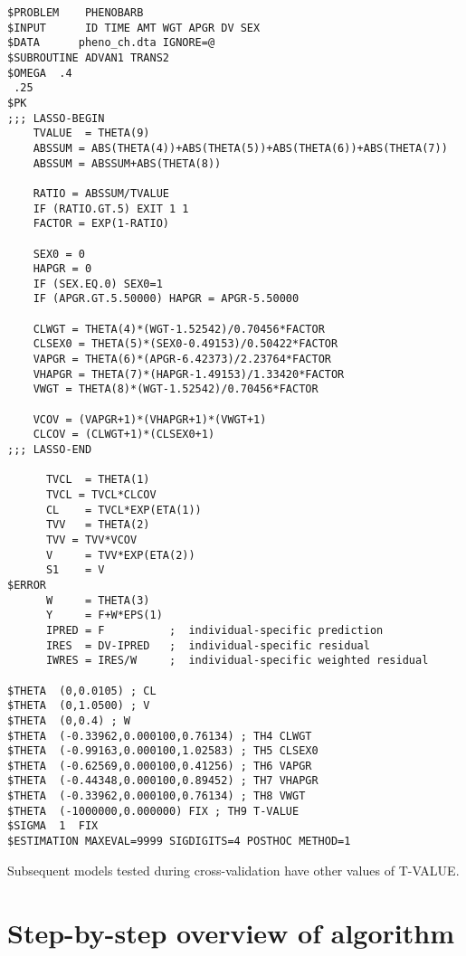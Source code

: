 \documentclass[a4paper,12pt]{article}
\begin{document}
\begin{verbatim}
$PROBLEM    PHENOBARB
$INPUT      ID TIME AMT WGT APGR DV SEX
$DATA      pheno_ch.dta IGNORE=@
$SUBROUTINE ADVAN1 TRANS2
$OMEGA  .4
 .25
$PK
;;; LASSO-BEGIN
    TVALUE  = THETA(9)
    ABSSUM = ABS(THETA(4))+ABS(THETA(5))+ABS(THETA(6))+ABS(THETA(7))
    ABSSUM = ABSSUM+ABS(THETA(8))

    RATIO = ABSSUM/TVALUE
    IF (RATIO.GT.5) EXIT 1 1
    FACTOR = EXP(1-RATIO)

    SEX0 = 0
    HAPGR = 0
    IF (SEX.EQ.0) SEX0=1
    IF (APGR.GT.5.50000) HAPGR = APGR-5.50000

    CLWGT = THETA(4)*(WGT-1.52542)/0.70456*FACTOR
    CLSEX0 = THETA(5)*(SEX0-0.49153)/0.50422*FACTOR
    VAPGR = THETA(6)*(APGR-6.42373)/2.23764*FACTOR
    VHAPGR = THETA(7)*(HAPGR-1.49153)/1.33420*FACTOR
    VWGT = THETA(8)*(WGT-1.52542)/0.70456*FACTOR

    VCOV = (VAPGR+1)*(VHAPGR+1)*(VWGT+1)
    CLCOV = (CLWGT+1)*(CLSEX0+1)
;;; LASSO-END

      TVCL  = THETA(1)
      TVCL = TVCL*CLCOV
      CL    = TVCL*EXP(ETA(1))
      TVV   = THETA(2)
      TVV = TVV*VCOV
      V     = TVV*EXP(ETA(2))
      S1    = V
$ERROR
      W     = THETA(3)
      Y     = F+W*EPS(1)
      IPRED = F          ;  individual-specific prediction
      IRES  = DV-IPRED   ;  individual-specific residual
      IWRES = IRES/W     ;  individual-specific weighted residual

$THETA  (0,0.0105) ; CL
$THETA  (0,1.0500) ; V
$THETA  (0,0.4) ; W
$THETA  (-0.33962,0.000100,0.76134) ; TH4 CLWGT
$THETA  (-0.99163,0.000100,1.02583) ; TH5 CLSEX0
$THETA  (-0.62569,0.000100,0.41256) ; TH6 VAPGR
$THETA  (-0.44348,0.000100,0.89452) ; TH7 VHAPGR
$THETA  (-0.33962,0.000100,0.76134) ; TH8 VWGT
$THETA  (-1000000,0.000000) FIX ; TH9 T-VALUE
$SIGMA  1  FIX
$ESTIMATION MAXEVAL=9999 SIGDIGITS=4 POSTHOC METHOD=1
\end{verbatim}

Subsequent models tested during cross-validation have other values of T-VALUE.


\section{Step-by-step overview of algorithm}
\end{document}
